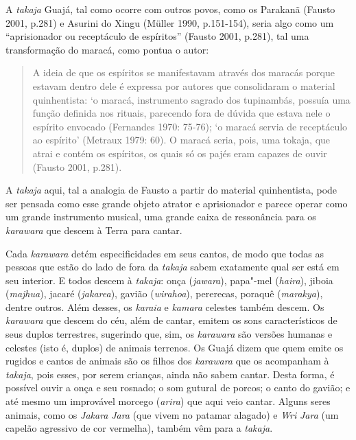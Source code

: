 A \emph{takaja} Guajá, tal como ocorre com outros povos, como os
Parakanã (Fausto 2001, p.281) e Asurini do Xingu (Müller 1990,
p.151-154), seria algo como um ``aprisionador ou receptáculo de
espíritos'' (Fausto 2001, p.281), tal uma transformação do maracá, como
pontua o autor:

\begin{quote}
A ideia de que os espíritos se manifestavam através dos maracás porque
estavam dentro dele é expressa por autores que consolidaram o material
quinhentista: `o maracá, instrumento sagrado dos tupinambás, possuía uma
função definida nos rituais, parecendo fora de dúvida que estava nele o
espírito envocado (Fernandes 1970: 75-76); `o maracá servia de
receptáculo ao espírito' (Metraux 1979: 60). O maracá seria, pois, uma
tokaja, que atrai e contém os espíritos, os quais só os pajés eram
capazes de ouvir (Fausto 2001, p.281).
\end{quote}

A \emph{takaja} aqui, tal a analogia de Fausto a partir do material
quinhentista, pode ser pensada como esse grande objeto atrator e
aprisionador e parece operar como um grande instrumento musical, uma
grande caixa de ressonância para os \emph{karawara} que descem à Terra
para cantar.

Cada \emph{karawara} detém especificidades em seus cantos, de modo que
todas as pessoas que estão do lado de fora da \emph{takaja} sabem
exatamente qual ser está em seu interior. E todos descem à
\emph{takaja}: onça (\emph{jawara}), papa"-mel (\emph{haira}), jiboia
(\emph{majhua}), jacaré (\emph{jakarea}), gavião (\emph{wirahoa}),
pererecas, poraquê (\emph{marakya}), dentre outros. Além desses, os
\emph{karaia} e \emph{kamara} celestes também descem. Os \emph{karawara}
que descem do céu, além de cantar, emitem os sons característicos de
seus duplos terrestres, sugerindo que, sim, os \emph{karawara} são
versões humanas e celestes (isto é, duplos) de animais terrenos. Os
Guajá dizem que quem emite os rugidos e cantos de animais são os filhos
dos \emph{karawara} que os acompanham à \emph{takaja}, pois esses, por
serem crianças, ainda não sabem cantar. Desta forma, é possível ouvir a
onça e seu rosnado; o som gutural de porcos; o canto do gavião; e até
mesmo um improvável morcego (\emph{arira}) que aqui veio cantar. Alguns
seres animais, como os \emph{Jakara} \emph{Jara} (que vivem no patamar
alagado) e \emph{Wri} \emph{Jara} (um capelão agressivo de cor
vermelha), também vêm para a \emph{takaja}.

